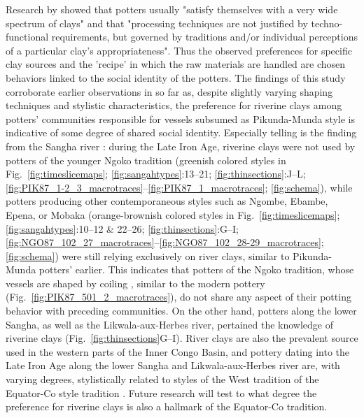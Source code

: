 \documentclass[smallextended,natbib]{svjour3}       %
\begin{document}
Research by \citet[148]{Gosselain.1997} showed that potters usually "satisfy themselves with a very wide spectrum of clays" and that "processing techniques are not justified by techno-functional requirements, but governed by traditions and/or individual perceptions of a particular clay's appropriateness". Thus the observed preferences for specific clay sources and the 'recipe' in which the raw materials are handled are chosen behaviors linked to the social identity of the potters. The findings of this study corroborate earlier observations \citep[123--124]{Seidensticker.2016b} in so far as, despite slightly varying shaping techniques and stylistic characteristics, the preference for riverine clays among potters' communities responsible for vessels subsumed as Pikunda-Munda style is indicative of some degree of shared social identity. Especially telling is the finding from the Sangha river \citep{Seidensticker.2020}: during the Late Iron Age, riverine clays were not used by potters of the younger Ngoko tradition (greenish colored styles in Fig.~\ref{fig:timeslicemaps}; \ref{fig:sangahtypes}:13--21; \ref{fig:thinsections}:J--L; \ref{fig:PIK87_1-2_3_macrotraces}--\ref{fig:PIK87_1_macrotraces}; \ref{fig:schema}), while potters producing other contemporaneous styles such as Ngombe, Ebambe, Epena, or Mobaka (orange-brownish colored styles in Fig.~\ref{fig:timeslicemaps}; \ref{fig:sangahtypes}:10--12 \& 22--26; \ref{fig:thinsections}:G--I; \ref{fig:NGO87_102_27_macrotraces}--\ref{fig:NGO87_102_28-29_macrotraces}; \ref{fig:schema}) were still relying exclusively on river clays, similar to Pikunda-Munda potters' earlier. This indicates that potters of the Ngoko tradition, whose vessels are shaped by coiling \citep[Fig.~\ref{fig:PIK87_1-2_3_macrotraces}--\ref{fig:PIK87_1_macrotraces};][53--54 Fig.~16B, 72 Tab.~13]{Seidensticker.2021e}, similar to the modern pottery (Fig.~\ref{fig:PIK87_501_2_macrotraces}), do not share any aspect of their potting behavior with preceding communities. On the other hand, potters along the lower Sangha, as well as the Likwala-aux-Herbes river, pertained the knowledge of riverine clays (Fig.~\ref{fig:thinsections}G--I). River clays are also the prevalent source used in the western parts of the Inner Congo Basin, and pottery dating into the Late Iron Age along the lower Sangha and Likwala-aux-Herbes river are, with varying degrees, stylistically related to styles of the West tradition of the Equator-Co style tradition \citep[221--222 Fig.~4]{Wotzka.1995}. Future research will test to what degree the preference for riverine clays is also a hallmark of the Equator-Co tradition.
\end{document}
